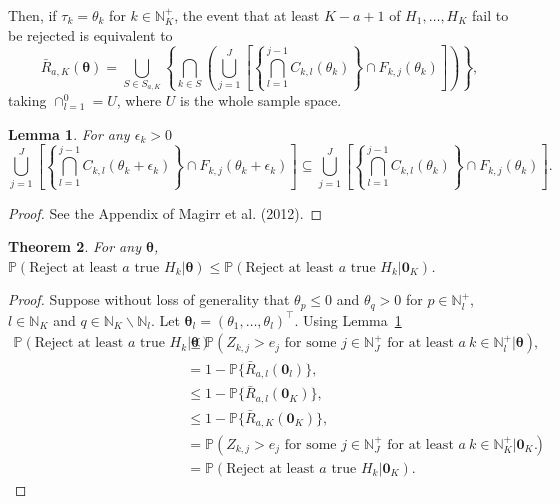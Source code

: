 \documentclass{article}
\numberwithin{equation}{section}
\theoremstyle{plain}
\newtheorem{thm}{Theorem}[section]
\newtheorem{lemma}[thm]{Lemma}
\begin{document}
Then, if $\tau_k=\theta_k$ for $k\in\mathbb{N}_K^+$, the event that at least $K-a+1$ of $H_{1},\dots,H_{K}$ fail to be rejected is equivalent to
\[ \bar{R}_{a,K}(\boldsymbol{\theta})=\bigcup_{S\in S_{a,K}}\left\{ \bigcap_{k\in S}\left( \bigcup_{j=1}^J \left[ \left\{ \bigcap_{l=1}^{j-1}C_{k,l}(\theta_k) \right\}\cap F_{k,j}(\theta_k) \right] \right) \right\}, \]
taking $\cap_{l=1}^0=U$, where $U$ is the whole sample space.

\begin{lemma}\label{lemma1}
	For any $\epsilon_k>0$
	\[ \bigcup_{j=1}^J \left[ \left\{ \bigcap_{l=1}^{j-1}C_{k,l}(\theta_k+\epsilon_k) \right\}\cap F_{k,j}(\theta_k+\epsilon_k) \right]\subseteq \bigcup_{j=1}^J \left[ \left\{ \bigcap_{l=1}^{j-1}C_{k,l}(\theta_k) \right\}\cap F_{k,j}(\theta_k) \right]. \]
\end{lemma}
\begin{proof}
	See the Appendix of Magirr et al. (2012).
\end{proof}

\begin{thm}\label{thm1}
	For any $\boldsymbol{\theta}$, $\mathbb{P}(\text{Reject at least }a\text{ true }H_{k}|\boldsymbol{\theta})\le\mathbb{P}(\text{Reject at least }a\text{ true }H_{k}|\boldsymbol{0}_K)$.
\end{thm}
\begin{proof}
	Suppose without loss of generality that $\theta_p\le0$ and $\theta_q>0$ for $p\in\mathbb{N}_l^+$, $l\in\mathbb{N}_K$ and $q\in\mathbb{N}_K\backslash\mathbb{N}_{l}$. Let $\boldsymbol{\theta}_l=(\theta_1,\dots,\theta_l)^\top$. Using Lemma~\ref{lemma1}
	\begin{align*}
	\mathbb{P}(\text{Reject at least }a\text{ true }H_{k}|\boldsymbol{\theta})&\le \mathbb{P}(Z_{k,j}>e_j\text{ for some }j\in\mathbb{N}_J^+ \text{ for at least } a \ k\in\mathbb{N}_l^+|\boldsymbol{\theta}),\\
	&= 1 - \mathbb{P}\{\bar{R}_{a,l}(\boldsymbol{0}_l)\},\\
	&\le 1 - \mathbb{P}\{\bar{R}_{a,l}(\boldsymbol{0}_K)\},\\
	&\le 1 - \mathbb{P}\{\bar{R}_{a,K}(\boldsymbol{0}_K)\},\\
	&=\mathbb{P}(Z_{k,j}>e_j\text{ for some }j\in\mathbb{N}_J^+ \text{ for at least } a \ k\in\mathbb{N}_K^+|\boldsymbol{0}_K).\\
	&=\mathbb{P}(\text{Reject at least }a\text{ true }H_{k}|\boldsymbol{0}_K).
	\end{align*}
\end{proof}
\end{document}
